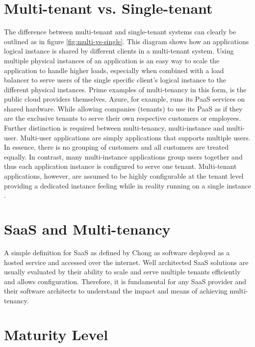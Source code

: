 \section{Multi-tenant vs. Single-tenant}

The difference between multi-tenant and single-tenant systems can clearly be outlined as in figure \ref{fig:multi-vs-single}. This diagram shows how an applications logical instance is shared by different clients in a multi-tenant system. Using multiple physical instances of an application is an easy way to scale the application to handle higher loads, especially when combined with a load balancer to serve users of the single specific client's logical instance to the different physical instances. Prime examples of multi-tenancy in this form, is the public cloud providers themselves. Azure, for example, runs its PaaS services on shared hardware. While allowing companies (tenants) to use its PaaS as if they are the exclusive tenants to serve their own respective customers or employees.
Further distinction is required between multi-tenancy, multi-instance  and multi-user. Multi-user applications are simply applications that supports multiple users. In essence, there is no grouping of customers and all customers are treated equally\cite{Bezemer:2010:MSA:1862372.1862393}. In contrast, many multi-instance applications group users together and thus each application instance is configured to serve one tenant. Multi-tenant applications, however, are assumed to be highly configurable at the tenant level providing a dedicated instance feeling while in reality running on a single instance \cite{Bezemer:2010:MSA:1862372.1862393}.

\section{SaaS and Multi-tenancy}

A simple definition for SaaS as defined by Chong \cite{Chong2006} as software deployed as a hosted service and accessed over the internet. Well architected SaaS solutions are usually evaluated by their ability to scale and serve multiple tenants efficiently and allows configuration. Therefore, it is fundamental for any SaaS provider and their software architects to understand the impact and means of achieving multi-tenancy.

\section{Maturity Level}

